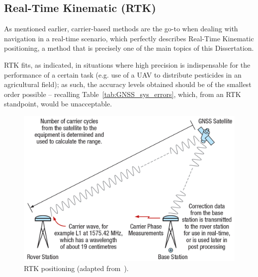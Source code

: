 


\subsection{Real-Time Kinematic (RTK)}\label{sec:II_gnssAug_rtk}

As mentioned earlier, carrier-based methods are the go-to when dealing with navigation in a real-time scenario, which perfectly describes Real-Time Kinematic positioning, a method that is precisely one of the main topics of this Dissertation.

RTK fits, as indicated, in situations where high precision is indispensable for the performance of a certain task (e.g. use of a UAV to distribute pesticides in an agricultural field); as such, the accuracy levels obtained should be of the smallest order possible -- recalling Table~\ref{tab:GNSS_sys_errors}, which, from an RTK standpoint, would be unacceptable.

\begin{figure}[ht]
	\centering
	\includegraphics[width=1.0\textwidth]{Chapters/Figures/rtk_workings.png}
	\caption{RTK positioning (adapted from~\cite{novatel_gnss}).}
	\label{fig:rtk_workings}
\end{figure}

